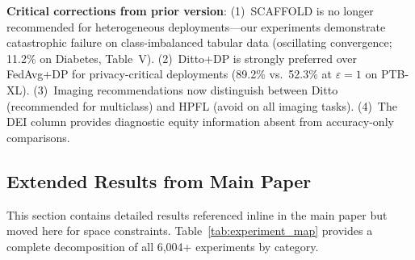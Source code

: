 \documentclass[conference]{IEEEtran}
\begin{document}
\textbf{Critical corrections from prior version}: (1)~SCAFFOLD is no longer recommended for heterogeneous deployments---our experiments demonstrate catastrophic failure on class-imbalanced tabular data (oscillating convergence; 11.2\% on Diabetes, Table~V). (2)~Ditto+DP is strongly preferred over FedAvg+DP for privacy-critical deployments (89.2\% vs.\ 52.3\% at $\varepsilon{=}1$ on PTB-XL). (3)~Imaging recommendations now distinguish between Ditto (recommended for multiclass) and HPFL (avoid on all imaging tasks). (4)~The DEI column provides diagnostic equity information absent from accuracy-only comparisons.


\subsection{Extended Results from Main Paper}
\label{sec:main_extended}

This section contains detailed results referenced inline in the main paper but moved here for space constraints. Table~\ref{tab:experiment_map} provides a complete decomposition of all 6,004+ experiments by category.
\end{document}
